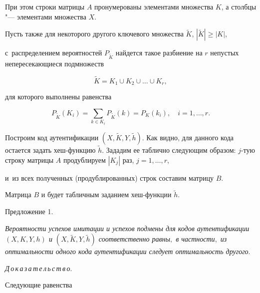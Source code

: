 При этом строки матрицы $A$ пронумерованы элементами множества $K$, а столбцы "--- элементами множества $X$. 

Пусть также для некоторого другого ключевого множества $\widetilde{K}$, $|\widetilde{K}|\geq |K|$, 

с~распределением вероятностей $P_{\widetilde{K}}$ найдется такое разбиение на $r$ непустых непересекающиеся подмножеств

\begin{equation}

\label{eq_ortog_10}

\widetilde{K} = K_1 \cup K_2 \cup \dots \cup K_r,

\end{equation}

для которого выполнены равенства

\begin{equation}

\label{eq_ortog_20}

{P}_{\widetilde{K}}(K_i) = \sum_{k\in K_i}P_{\widetilde{K}}(k) = P_{K}(k_i), \quad i=1,\dots,r.

\end{equation}

Построим код аутентификации $(X,\widetilde{K},Y,\widetilde{h})$. Как видно, для данного кода остается задать хеш-функцию $\widetilde{h}$. Зададим ее таблично следующим образом: $j$-тую строку матрицы $A$ продублируем $|K_j|$ раз, $j=1,\dots,r$, 

и~из всех полученных (продублированных) строк составим матрицу $B$. 

Матрица $B$ и будет табличным заданием хеш-функции $\widetilde{h}$.





\vskip 0.1in





\hypertarget{rats:pr:1}{}

{\small \sc Предложение 1}.

{\it Вероятности успехов имитации и успехов подмены для кодов аутентификации $(X, {K}, Y, {h})$ и $(X,\widetilde{K}, Y,\widetilde{h})$ соответственно равны$,$ в частности$,$ из оптимальности одного кода аутентификации следует оптимальность другого$.$

}



{\it Д\,о\,к\,а\,з\,а\,т\,е\,л\,ь\,с\,т\,в\,о}.

Следующие равенства 

